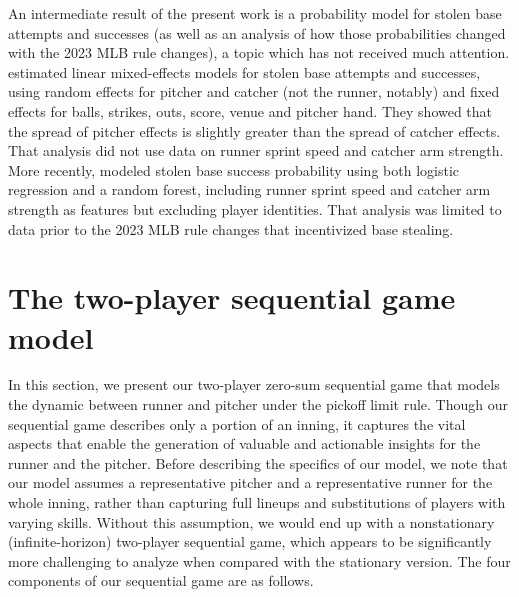 \documentclass[opre,dblanonrev]{informs4}
\begin{document}
    An intermediate result of the present work is a probability model for stolen base attempts and successes (as well as an analysis of how those probabilities changed with the 2023 MLB rule changes), a topic which has not received much attention. \citet{loughin_assessing_2008} estimated linear mixed-effects models for stolen base attempts and successes, using random effects for pitcher and catcher (not the runner, notably) and fixed effects for balls, strikes, outs, score, venue and pitcher hand. They showed that the spread of pitcher effects is slightly greater than the spread of catcher effects. That analysis did not use data on runner sprint speed and catcher arm strength. More recently, \citet{stanley_modeling_2023} modeled stolen base success probability using both logistic regression and a random forest, including runner sprint speed and catcher arm strength as features but excluding player identities. That analysis was limited to data prior to the 2023 MLB rule changes that incentivized base stealing.
   
    \section{The two-player sequential game model}
    \label{sec:sg-model}
    In this section, we present our two-player zero-sum sequential game that models the dynamic between runner and pitcher under the pickoff limit rule. Though our sequential game describes only a portion of an inning, it captures the vital aspects that enable the generation of valuable and actionable insights for the runner and the pitcher. Before describing the specifics of our model, we note that our model assumes a representative pitcher and a representative runner for the whole inning, rather than capturing full lineups and substitutions of players with varying skills. Without this assumption, we would end up with a nonstationary (infinite-horizon) two-player sequential game, which appears to be significantly more challenging to analyze when compared with the stationary version. The four components of our sequential game are as follows.
\end{document}

